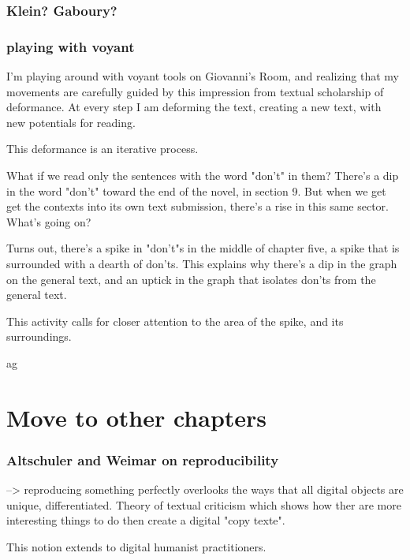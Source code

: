 \documentclass[11pt]{article}
\begin{document}
\subsubsection{Klein? Gaboury?}
\label{sec:orgec393d3}

\subsubsection{playing with voyant}
\label{sec:orgcc4b209}
I'm playing around with voyant tools on Giovanni's Room, and realizing
that my movements are carefully guided by this impression from textual
scholarship of deformance. At every step I am deforming the text,
creating a new text, with new potentials for reading. 

This deformance is an iterative process. 

What if we read only the sentences with the word "don't" in them?
There's a dip in the word "don't" toward the end of the novel, in
section 9. But when we get get the contexts into its own text
submission, there's a rise in this same sector. What's going on? 

Turns out, there's a spike in "don't"s in the middle of chapter five,
a spike that is surrounded with a dearth of don'ts. This explains why
there's a dip in the graph on the general text, and an uptick in the
graph that isolates don'ts from the general text.

This activity calls for closer attention to the area of the spike, and
its surroundings.

ag


\section{Move to other chapters}
\label{sec:org2ef6088}
\subsubsection{Altschuler and Weimar on reproducibility}
\label{sec:org01156dc}

--> reproducing something perfectly overlooks the ways that all
digital objects are unique, differentiated. Theory of textual
criticism which shows how ther are more interesting things to do then
create a digital "copy texte". 

This notion extends to digital humanist practitioners. 
\end{document}
